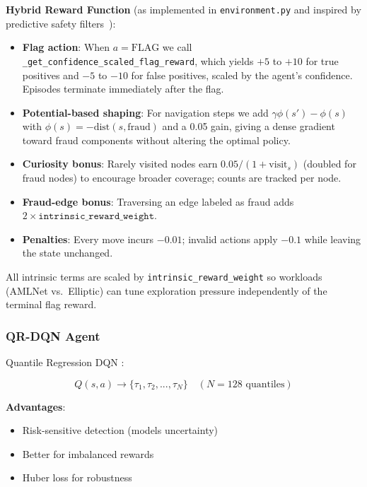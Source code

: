 \documentclass[11pt,a4paper]{article}
\begin{document}
\textbf{Hybrid Reward Function} (as implemented in \texttt{environment.py} and inspired by predictive safety filters~\cite{wabersich2018predictive}):
\begin{itemize}
    \item \textbf{Flag action}: When $a=\text{FLAG}$ we call \texttt{\_get\_confidence\_scaled\_flag\_reward}, which yields $+5$ to $+10$ for true positives and $-5$ to $-10$ for false positives, scaled by the agent's confidence. Episodes terminate immediately after the flag.
    \item \textbf{Potential-based shaping}: For navigation steps we add $\gamma \phi(s') - \phi(s)$ with $\phi(s)=-\text{dist}(s,\text{fraud})$ and a 0.05 gain, giving a dense gradient toward fraud components without altering the optimal policy.
    \item \textbf{Curiosity bonus}: Rarely visited nodes earn $0.05/(1+\text{visit}_s)$ (doubled for fraud nodes) to encourage broader coverage; counts are tracked per node.
    \item \textbf{Fraud-edge bonus}: Traversing an edge labeled as fraud adds $2 \times \texttt{intrinsic\_reward\_weight}$.
    \item \textbf{Penalties}: Every move incurs $-0.01$; invalid actions apply $-0.1$ while leaving the state unchanged.
\end{itemize}
All intrinsic terms are scaled by \texttt{intrinsic\_reward\_weight} so workloads (AMLNet vs.\ Elliptic) can tune exploration pressure independently of the terminal flag reward.

\subsubsection{QR-DQN Agent}

Quantile Regression DQN \cite{dabney2018distributional}:

\begin{equation}
Q(s,a) \rightarrow \{\tau_1, \tau_2, ..., \tau_N\} \quad (N=128 \text{ quantiles})
\end{equation}

\textbf{Advantages}:
\begin{itemize}
    \item Risk-sensitive detection (models uncertainty)
    \item Better for imbalanced rewards
    \item Huber loss for robustness
\end{itemize}
\end{document}
